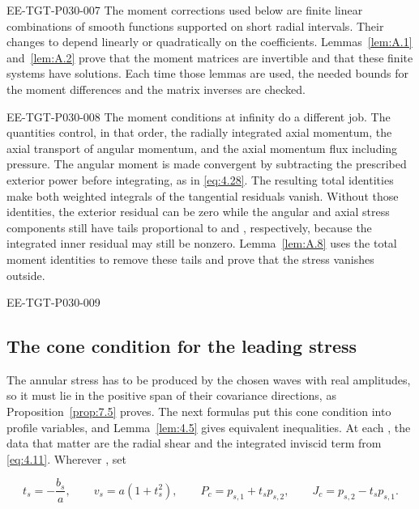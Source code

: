 \begin{EESegment}{EE-TGT-P030-007}
The moment corrections used below are finite linear combinations of smooth
functions supported on short radial intervals. Their changes to
 depend linearly or quadratically on the
coefficients. Lemmas~\ref{lem:A.1} and~\ref{lem:A.2} prove that the moment
matrices are invertible and that these finite systems have solutions. Each
time those lemmas are used, the needed bounds for the moment differences and
the matrix inverses are checked.
\end{EESegment}

\begin{EESegment}{EE-TGT-P030-008}
The moment conditions at infinity do a different job. The quantities
 control, in that order, the radially integrated
axial momentum, the axial transport of angular momentum, and the axial
momentum flux including pressure. The angular moment
 is made convergent by subtracting the prescribed
exterior power  before integrating, as in
\eqref{eq:4.28}. The resulting total identities make both weighted integrals
of the tangential residuals vanish. Without those identities, the exterior
residual can be zero while the angular and axial stress components still have
tails proportional to  and
, respectively, because the integrated inner
residual may still be nonzero. Lemma~\ref{lem:A.8} uses the total moment
identities to remove these tails and prove that the stress vanishes outside.
\end{EESegment}

\begin{EESegment}{EE-TGT-P030-009}
\subsection{The cone condition for the leading stress}\label{sec:4.3}

The annular stress  has to be produced by
the chosen waves with real amplitudes, so it must lie in the positive
span of their covariance directions, as Proposition~\ref{prop:7.5} proves.
The next formulas put this cone condition into profile variables, and
Lemma~\ref{lem:4.5} gives equivalent inequalities. At each
, the data that matter are the radial shear
 and the integrated inviscid term
 from \eqref{eq:4.11}. Wherever
, set
\end{EESegment}
\begin{equation}
 t_s=-\frac{b_s}{a},\qquad
 v_s=a(1+t_s^2),\qquad
 P_c=p_{s,1}+t_sp_{s,2},\qquad
 J_c=p_{s,2}-t_sp_{s,1}.
\tag{4.20}\label{eq:4.20}
\end{equation}
